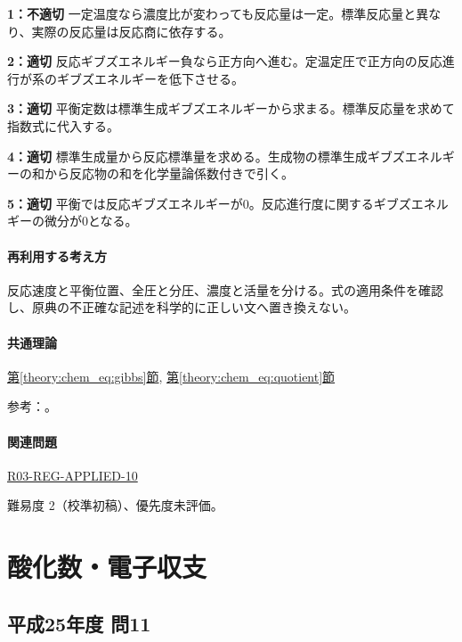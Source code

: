 \noindent\textbf{1：不適切} 一定温度なら濃度比が変わっても反応量は一定。標準反応量と異なり、実際の反応量は反応商に依存する。\par

\noindent\textbf{2：適切} 反応ギブズエネルギー負なら正方向へ進む。定温定圧で正方向の反応進行が系のギブズエネルギーを低下させる。\par

\noindent\textbf{3：適切} 平衡定数は標準生成ギブズエネルギーから求まる。標準反応量を求めて指数式に代入する。\par

\noindent\textbf{4：適切} 標準生成量から反応標準量を求める。生成物の標準生成ギブズエネルギーの和から反応物の和を化学量論係数付きで引く。\par

\noindent\textbf{5：適切} 平衡では反応ギブズエネルギーが0。反応進行度に関するギブズエネルギーの微分が0となる。\par

\paragraph{再利用する考え方} 反応速度と平衡位置、全圧と分圧、濃度と活量を分ける。式の適用条件を確認し、原典の不正確な記述を科学的に正しい文へ置き換えない。

\paragraph{共通理論} \hyperref[theory:chem_eq:gibbs]{第\ref*{theory:chem_eq:gibbs}節}, \hyperref[theory:chem_eq:quotient]{第\ref*{theory:chem_eq:quotient}節}

\par 参考：\cite{iupac_greenbook2012}。

\paragraph{関連問題} \hyperref[q:r03-reg-applied-10]{R03-REG-APPLIED-10}

\par 難易度 2（校準初稿）、優先度未評価。

\section{酸化数・電子収支}

\subsection{平成25年度 問11}
\label{q:h25-reg-applied-11}

